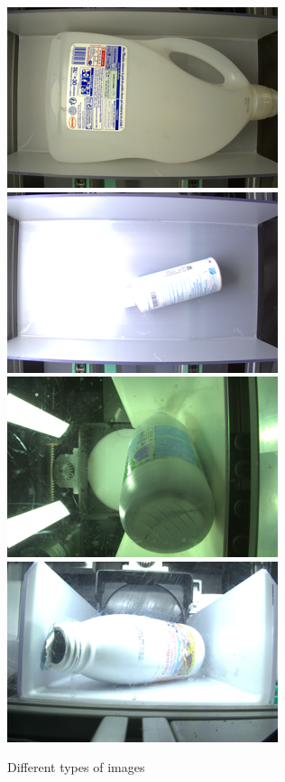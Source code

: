 \documentclass[11pt]{article}
\begin{document}
\begin{figure}[H]
  \centering
  \includegraphics[scale=0.38]{image/top-dim.png}
  \includegraphics[scale=0.38]{image/top-lit.png}
  \includegraphics[scale=0.38]{image/side-vertical.png}
  \includegraphics[scale=0.38]{image/side-horizontal.png}
  \caption{Different types of images}
\end{figure}
\end{document}
